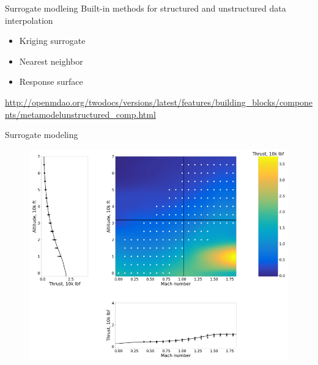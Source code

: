 \documentclass[aspectratio=169, usenames,dvipsnames, 14pt]{beamer}
\begin{document}
\begin{frame}{Surrogate modleing}
	Built-in methods for structured and unstructured data interpolation
	\begin{itemize}
		\item Kriging surrogate
		\item Nearest neighbor
		\item Response surface
	\end{itemize}
	
	\url{http://openmdao.org/twodocs/versions/latest/features/building_blocks/components/metamodelunstructured_comp.html}

\end{frame}

\begin{frame}{Surrogate modeling}
	\begin{figure}
		\includegraphics[scale=.39]{images/slide_131.png}
	\end{figure}
\end{frame}
\end{document}

